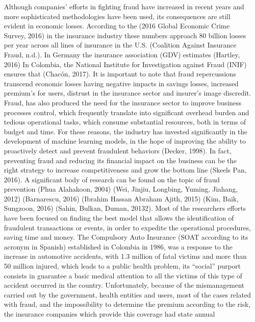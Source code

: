\documentclass[parskip=full]{scrartcl}
\begin{document}
Although companies’ efforts in fighting fraud have increased in recent years 
and more sophisticated methodologies have been used, its consequences are still 
evident in economic losses. According to the (2016 Global Economic Crime 
Survey, 2016) in the insurance industry these numbers approach 80 billion 
losses per year across all lines of insurance in the U.S. (Coalition Against 
Insurance Fraud, n.d.). In Germany the insurance association (GDV) estimates 
(Hartley, 2016) In Colombia, the National Institute for Investigation against 
Fraud (INIF) ensures that (Chacón, 2017).  It is important to note that fraud 
repercussions transcend economic losses having negative impacts in savings 
losses, increased premium’s for users, distrust in the insurance sector and 
insurer’s image discredit. Fraud, has also produced the need for the insurance 
sector to improve business processes control, which frequently translate into 
significant overhead burden and tedious operational tasks, which consume 
substantial resources, both in terms of budget and time. 
For these reasons, the industry has invested significantly in the development 
of machine learning models, in the hope of improving the ability to proactively 
detect and prevent fraudulent behaviors (Decker, 1998). In fact, preventing 
fraud and reducing its financial impact on the business can be the right 
strategy to increase competitiveness and grow the bottom line (Skeels Pan, 
2016). A significant body of research can be found on the topic of fraud 
prevention (Phua Alahakoon, 2004) (Wei, Jinjiu, Longbing, Yuming, Jiahang, 
2012) (Barnarescu, 2016) (Ibrahim Hassan Abraham Ajith, 2015) (Kim, Baik,  
Sungzoon, 2016) (Sahin, Bulkan, Duman, 20132). Most of the researchers 
efforts have been focused on finding the best model that allows the 
identification of fraudulent transactions or events, in order to expedite the 
operational procedures, saving time and money.
The Compulsory Auto Insurance (SOAT according to its acronym in Spanish) 
established in Colombia in 1986, was a response to the increase in automotive 
accidents, with 1.3 million of fatal victims and more than 50 million injured, 
which leads to a public health problem, its “social” purport consists in 
guarantee a basic medical attention to all the victims of this type of accident 
occurred in the country. Unfortunately, because of the mismanagement carried 
out by the government, health entities and users, most of the cases related 
with fraud, and the impossibility to determine the premium according to the 
risk, the insurance companies which provide this coverage had state annual 
\end{document}

